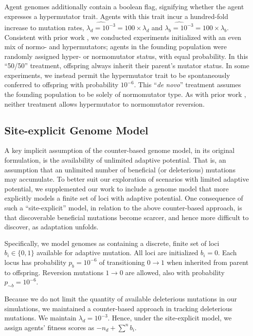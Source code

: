 Agent genomes additionally contain a boolean flag, signifying whether the agent expresses a hypermutator trait.
Agents with this trait incur a hundred-fold increase to mutation rates, $\hat{\lambda_d=10^{-3}} = 100 \times \lambda_d$ and $\hat{\lambda_b=10^{-3}} = 100 \times \lambda_b$.
Consistent with prior work \citep{raynes2018sign}, we conducted experiments initialized with an even mix of normo- and hypermutators;
agents in the founding population were randomly assigned hyper- or normomutator status, with equal probability.
In this ``50/50'' treatment, offspring always inherit their parent's mutator status.
In some experiments, we instead permit the hypermutator trait to be spontaneously conferred to offspring with probability $10^{-6}$.
This ``\textit{de novo}'' treatment assumes the founding population to be solely of normomutator type.
As with prior work \citep{raynes2018sign}, neither treatment allows hypermutator to normomutator reversion.

\subsection{Site-explicit Genome Model} \label{sec:site-explicit}

A key implicit assumption of the counter-based genome model, in its original formulation, is the availability of unlimited adaptive potential.
That is, an assumption that an unlimited number of beneficial (or deleterious) mutations may accumulate.
To better suit our exploration of scenarios with limited adaptive potential, we supplemented our work to include a genome model that more explicitly models a finite set of loci with adaptive potential.
One consequence of such a ``site-explicit'' model, in relation to the above counter-based approach, is that discoverable beneficial mutations become scarcer, and hence more difficult to discover, as adaptation unfolds.

Specifically, we model genomes as containing a discrete, finite set of loci $b_i \in \{0, 1\}$ available for adaptive mutation.
All loci are initialized $b_i = 0$.
Each locus has probability $p_b = 10^{-6}$ of transitioning $0 \rightarrow 1$ when inherited from parent to offspring.
Reversion mutations $1 \rightarrow 0$ are allowed, also with probability $p_{\sim b} = 10^{-6}$.

Because we do not limit the quantity of available deleterious mutations in our simulations, we maintained a counter-based approach in tracking deleterious mutations.
We maintain $\lambda_d = 10^{-3}$.
Hence, under the site-explicit model, we assign agents' fitness scores as $-n_d + \sum^n b_i$.

